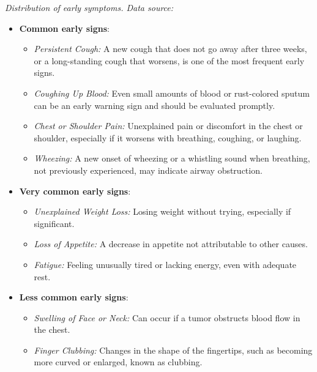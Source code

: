 \begin{center}
    \textit{Distribution of early symptoms. Data source:\cite{cm2019}}
\end{center}

\begin{itemize}
    \item \textbf{Common early signs}: 
        \begin{itemize}
            \item \textit{Persistent Cough:} A new cough that does not go away after three weeks, 
            or a long-standing cough that worsens, is one of the most frequent early signs.

            \item \textit{Coughing Up Blood:} Even small amounts of blood or rust-colored sputum 
            can be an early warning sign and should be evaluated promptly.
    
            \item \textit{Chest or Shoulder Pain:} Unexplained pain or discomfort in the chest or 
            shoulder, especially if it worsens with breathing, coughing, or laughing.
        
            \item \textit{Wheezing:} A new onset of wheezing or a whistling sound when breathing, 
            not previously experienced, may indicate airway obstruction.
        \end{itemize}
    
    \newpage
    \item \textbf{Very common early signs}:
        \begin{itemize}
            \item \textit{Unexplained Weight Loss:} Losing weight without trying, especially if 
            significant.

            \item \textit{Loss of Appetite:} A decrease in appetite not attributable to other 
            causes.
    
            \item \textit{Fatigue:} Feeling unusually tired or lacking energy, even with adequate 
            rest.
        \end{itemize}
    
    \item \textbf{Less common early signs}:
        \begin{itemize}
            \item \textit{Swelling of Face or Neck:} Can occur if a tumor obstructs blood flow in 
            the chest.

            \item \textit{Finger Clubbing:} Changes in the shape of the fingertips, such as 
            becoming more curved or enlarged, known as clubbing.
        \end{itemize}
\end{itemize}

